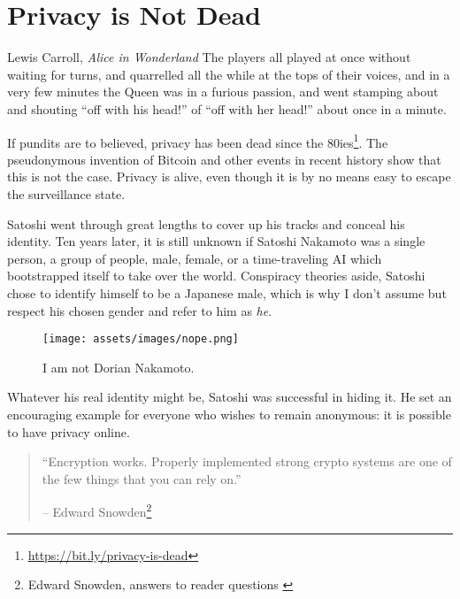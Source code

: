 \chapter{Privacy is Not Dead}
\label{les:19}

\begin{chapquote}{Lewis Carroll, \textit{Alice in Wonderland}}
The players all played at once without waiting for turns, and quarrelled all
the while at the tops of their voices, and in a very few minutes the Queen was
in a furious passion, and went stamping about and shouting \enquote{off with his
head!} of \enquote{off with her head!} about once in a minute.
\end{chapquote}

If pundits are to believed, privacy has been dead since the
80ies\footnote{\url{https://bit.ly/privacy-is-dead}}. The pseudonymous invention
of Bitcoin and other events in recent history show that this is not the case.
Privacy is alive, even though it is by no means easy to escape the surveillance
state.

Satoshi went through great lengths to cover up his tracks and conceal
his identity. Ten years later, it is still unknown if Satoshi Nakamoto
was a single person, a group of people, male, female, or a
time-traveling AI which bootstrapped itself to take over the world.
Conspiracy theories aside, Satoshi chose to identify himself to be a
Japanese male, which is why I don't assume but respect his chosen gender
and refer to him as \textit{he}.

\begin{figure}
  \texttt{[image: assets/images/nope.png]}
  \caption{I am not Dorian Nakamoto.}
  \label{fig:nope}
\end{figure}

Whatever his real identity might be, Satoshi was successful in hiding
it. He set an encouraging example for everyone who wishes to remain
anonymous: it is possible to have privacy online.

\begin{quotation}\begin{samepage}
\enquote{Encryption works. Properly implemented strong crypto systems are one
of the few things that you can rely on.}
\begin{flushright} -- Edward Snowden\footnote{Edward Snowden, answers to reader questions \cite{snowden}}
\end{flushright}\end{samepage}\end{quotation}

